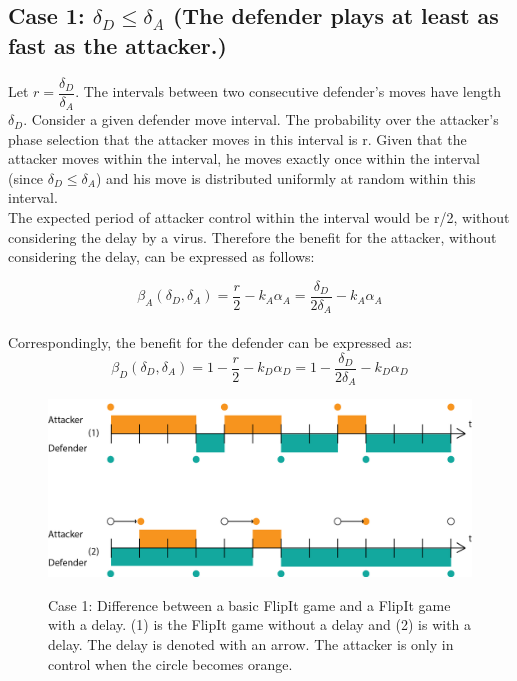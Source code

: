 \subsection*{\textbf{Case 1:} $\delta_{D} \leq \delta_{A} $ (The defender plays at least as fast as the attacker.) }

Let $r = \dfrac{\delta_{D}}{ \delta_{A} }$. The intervals between two consecutive defender's moves have length $\delta_{D}$. Consider a given defender move interval. The probability over the attacker's phase selection that the attacker moves in this interval is r. Given that the attacker moves within the interval, he moves exactly once within the interval (since $\delta_{D} \leq \delta_{A} $) and his move is distributed uniformly at random within this interval. \\

The expected period of attacker control within the interval would be r/2, without considering the delay by a virus. Therefore the benefit for the attacker, without considering the delay, can be expressed as follows:

\begin{equation*}
\beta_{A}(\delta_{D},\delta_{A}) =\dfrac {r} {2} - k_{A} \alpha_{A} = \dfrac {\delta_{D}} {2\delta_{A}} - k_{A} \alpha_{A}  
\end{equation*}\\

Correspondingly, the benefit for the defender can be expressed as:
\begin{equation*}
\beta_{D}(\delta_{D},\delta_{A}) =1 -  \dfrac {r} {2} - k_{D} \alpha_{D} = 1 - \dfrac {\delta_{D}} {2\delta_{A}} - k_{D} \alpha_{D} 
\end{equation*}

\begin{figure}[hbtp]
\caption{Case 1: Difference between a basic FlipIt game and a FlipIt game with a delay. (1) is the FlipIt game without a delay and (2) is with a delay. The delay is denoted with an arrow. The attacker is only in control when the circle becomes orange.}
\centering
\includegraphics[scale=0.6]{../../doc/template/Images/DiffDelayCase1.png}
\label{fig:delaycase1}
\end{figure}


